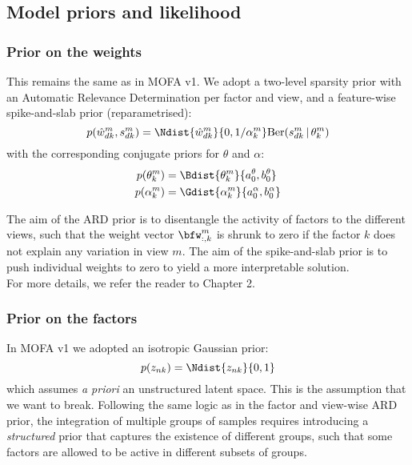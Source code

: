 \subsection{Model priors and likelihood}

\subsubsection{Prior on the weights}

This remains the same as in MOFA v1. We adopt a two-level sparsity prior with an Automatic Relevance Determination per factor and view, and a feature-wise spike-and-slab prior (reparametrised\cite{Titsias2011}):
\begin{equation}
	p(\hat{w}_{dk}^m,s_{dk}^m) = \Ndist{\hat{w}_{dk}^{m}}{0, 1/\alpha_{k}^{m}}  \text{Ber}(s_{dk}^{m} \,|\,\theta_{k}^{m})
\end{equation}
with the corresponding conjugate priors for $\theta$ and $\alpha$:
\begin{align}
	p(\theta_k^m) &= \Bdist{\theta_k^m}{a_0^\theta,b_0^\theta}\\
	p(\alpha_k^m) &= \Gdist{\alpha_k^m}{a_0^\alpha, b_0^\alpha}
\end{align}

The aim of the ARD prior is to disentangle the activity of factors to the different views, such that the weight vector $\bfw_{:,k}^m$ is shrunk to zero if the factor $k$ does not explain any variation in view $m$. The aim of the spike-and-slab prior is to push individual weights to zero to yield a more interpretable solution.\\
For more details, we refer the reader to Chapter 2.


\subsubsection{Prior on the factors}

In MOFA v1 we adopted an isotropic Gaussian prior:
\begin{equation}
	p(z_{nk}) = \Ndist{z_{nk}}{0,1}
\end{equation}
which assumes \textit{a priori} an unstructured latent space. This is the assumption that we want to break. Following the same logic as in the factor and view-wise ARD prior, the integration of multiple groups of samples requires introducing a \textit{structured} prior that captures the existence of different groups, such that some factors are allowed to be active in different subsets of groups.

